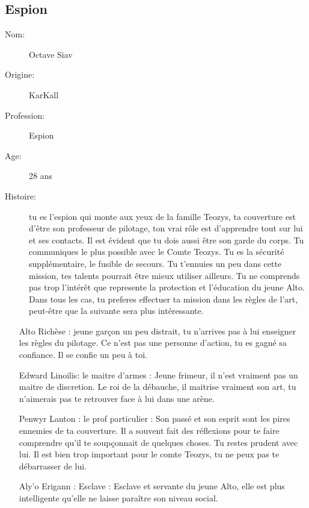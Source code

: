 \documentclass[oneside,12pt]{book}
\begin{document}
\begin{flushleft}
\section{Espion}
\begin{description}
\item[Nom:]{Octave Siav}
\item[Origine:]{KarKall}
\item[Profession:]{Espion}
\item[Age:]{28 ans}
\item[Histoire:]{
tu es l'espion qui monte aux yeux de la famille Teozys, ta couverture est d'être son professeur de pilotage, ton vrai rôle est d'apprendre tout sur lui et ses contacts. Il est évident que tu dois aussi être son garde du corps. Tu communiques le plus possible avec le Comte Teozys. Tu es la sécurité supplémentaire, le fusible de secours.
	Tu t'ennuies un peu dans cette mission, tes talents pourrait être mieux utiliser ailleurs. Tu ne comprends pas trop l'intérêt que represente la protection et l'éducation du jeune Alto. 
Dans tous les cas, tu preferes effectuer ta mission dans les règles de l'art, peut-être que la suivante sera plus intéressante.
}
\end{description}
		\begin{itemize}
		\item[Alto Richèse]: jeune garçon un peu distrait, tu n'arrives pas à lui enseigner les règles du pilotage. Ce n'est pas une personne d'action, tu es gagné  sa confiance. Il se confie un peu à toi.  
		\item[Edward Linoilis: le maitre d'armes]: Jeune frimeur, il n'est vraiment pas un maitre de discretion. Le roi de la débauche, il maitrise vraiment son art, tu n'aimerais pas te retrouver face à lui dans une arène. 
		\item[Penwyr Lanton : le prof particulier]:  Son passé et son esprit sont les pires ennemies de ta couverture. Il a souvent fait des réflexions pour te faire comprendre qu'il te soupçonnait de quelques choses. Tu restes prudent avec lui. Il est bien trop important pour le comte Teozys, tu ne peux pas te débarrasser de lui.
		\item[Aly'o Erigann : Esclave ]: Esclave et servante du jeune Alto, elle est plus intelligente qu'elle ne laisse paraître son niveau social.     

		\end{itemize} 



\clearpage

\end{flushleft}
\end{document}
